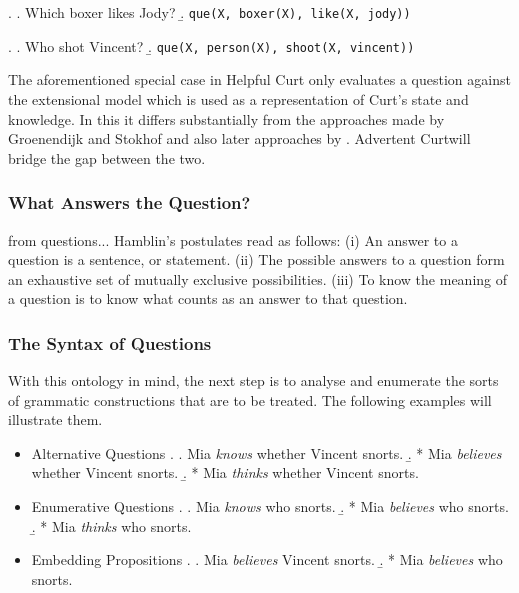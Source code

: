 \documentclass[11pt,a4paper]{article}
\newcommand{\code}{\texttt} %
\newcommand{\pn}{\textsf} %
\newcommand{\curt}{\pn{Curt}}
\newcommand{\acurt}{\pn{Advertent Curt}}
\theoremstyle{remark}
\theoremstyle{remark}
\theoremstyle{definition}
\begin{document}
\ex. \a. \label{ex:bbqueexa} Which boxer likes Jody?
\b. \label{ex:bbqueparsea} \code{que(X, boxer(X), like(X, jody))}

\ex. \a. \label{ex:bbqueexb} Who shot Vincent?
\b. \label{ex:bbqueparseb} \code{que(X, person(X), shoot(X, vincent))}

The aforementioned special case in \pn{Helpful Curt} only evaluates a question
against the extensional model which is used as a representation of \curt's state
and knowledge. In this it differs substantially from the approaches made by
Groenendijk and Stokhof and also later approaches by \cite{g:is}. \acurt will
bridge the gap between the two.

\subsubsection{What Answers the Question?}\label{sec:answerhood}

from questions...
                   Hamblin’s postulates read as follows:
     (i) An answer to a question is a sentence, or statement.
    (ii) The possible answers to a question form an exhaustive set of mutually
exclusive possibilities.
   (iii) To know the meaning of a question is to know what counts as an answer to
that question.


\subsubsection{The Syntax of Questions}

With this ontology in mind, the next step is to analyse and enumerate the sorts
of grammatic constructions that are to be treated. The following examples will
illustrate them.

\begin{itemize}
  \item Alternative Questions
  \ex. \a. Mia \emph{knows} whether Vincent snorts.
  \b. * Mia \emph{believes} whether Vincent snorts.
  \b. * Mia \emph{thinks} whether Vincent snorts.
  
  \item Enumerative Questions
  \ex. \a.  Mia \emph{knows} who snorts.
  \b. * Mia \emph{believes} who snorts.
  \b. * Mia \emph{thinks} who snorts.

  \item Embedding Propositions
  \ex. \label{ex:stipul}
  \a. Mia \emph{believes} Vincent snorts.
  \b. * Mia \emph{believes} who snorts.

\end{itemize}
\end{document}
